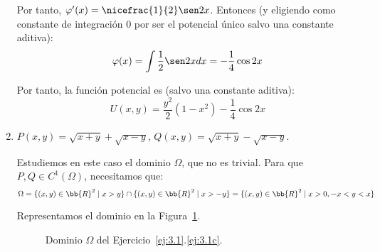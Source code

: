 \begin{ejercicio}
\begin{enumerate}
        Por tanto, $\varphi'(x)=\nicefrac{1}{2}\sen 2x$. Entonces (y eligiendo como constante de integración $0$ por ser el potencial único salvo una constante aditiva):
        \begin{equation*}
            \varphi(x)=\int \frac{1}{2}\sen 2xdx=-\frac{1}{4}\cos 2x
        \end{equation*}

        Por tanto, la función potencial es (salvo una constante aditiva):
        \begin{equation*}
            U(x,y)=\frac{y^2}{2}(1-x^2)-\frac{1}{4}\cos 2x
        \end{equation*}

        \item \label{ej:3.1c} $P(x, y) = \sqrt{x+y}+\sqrt{x-y}$, $Q(x, y) = \sqrt{x+y}-\sqrt{x-y}$.
        
        Estudiemos en este caso el dominio $\Omega$, que no es trivial. Para que $P,Q\in C^1(\Omega)$, necesitamos que:
        \begin{equation*}
            \Omega=\{(x,y)\in\bb{R}^2 \mid x> y\}\cap\{(x,y)\in\bb{R}^2 \mid x> -y\}
            = \{(x,y)\in\bb{R}^2 \mid x>0, -x< y< x\}
        \end{equation*}

        Representamos el dominio en la Figura~\ref{fig:3.1c}.
        \begin{figure}[h]
            \centering
            \caption{Dominio $\Omega$ del Ejercicio~\ref{ej:3.1}.\ref{ej:3.1c}.}
            \label{fig:3.1c}
        \end{figure}


\end{enumerate}
\end{ejercicio}
